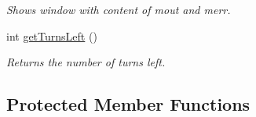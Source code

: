 \begin{DoxyCompactItemize}
\begin{DoxyCompactList}\small\item\em Shows window with content of mout and merr. \end{DoxyCompactList}\item 
int \hyperlink{classGame_a86c625ebc5fedb4072d007ed42d89671}{get\+Turns\+Left} ()\hypertarget{classGame_a86c625ebc5fedb4072d007ed42d89671}{}\label{classGame_a86c625ebc5fedb4072d007ed42d89671}

\begin{DoxyCompactList}\small\item\em Returns the number of turns left. \end{DoxyCompactList}\end{DoxyCompactItemize}
\subsection*{Protected Member Functions}
